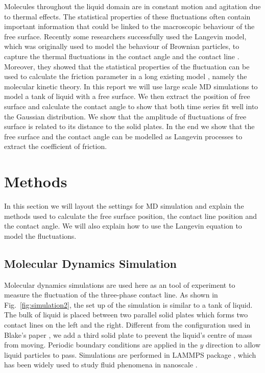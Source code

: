 \documentclass[
reprint,
 amsmath,amssymb,
 aps,
url
]{revtex4-1}
\begin{document}
Molecules throughout the liquid domain are in constant motion and agitation due to thermal effects. The statistical properties of these fluctuations often contain important information that could be linked to the macroscopic behaviour of the free surface. Recently some researchers successfully used the Langevin model, which was originally used to model the behaviour of Brownian particles, to capture the thermal fluctuations in the contact angle \cite{smith_langevin_2016} and the contact line \cite{fernandez-toledano_contact-line_2019}. Moreover, they showed that the statistical properties of the fluctuation can be used to calculate the friction parameter in a long existing model \cite{cherry_kinetics_1969, blake_kinetics_1969}, namely the molecular kinetic theory. In this report we will use large scale MD simulations to model a tank of liquid with a free surface. We then extract the position of free surface  and calculate the contact angle to show that both time series fit well into the Gaussian distribution. We show that the amplitude of fluctuations of free surface is related to its distance to the solid plates. In the end we show that the free surface and the contact angle can be modelled as Langevin processes to extract the coefficient of friction.



\section{Methods}

In this section we will layout the settings for MD simulation and explain the methods used to calculate the free surface position, the contact line position and the contact angle. We will also explain how to use the Langevin equation to model the fluctuations.

\subsection{Molecular Dynamics Simulation}

Molecular dynamics simulations are used here as an tool of experiment to measure the fluctuation of the three-phase contact line. As shown in Fig.~\ref{fig:simulation2}, the set up of the simulation is similar to a tank of liquid. The bulk of liquid is placed between two parallel solid plates which forms two contact lines on the left and the right. Different from the configuration used in Blake's paper \cite{fernandez-toledano_contact-line_2019}, we add a third solid plate to prevent the liquid's centre of mass from moving. Periodic boundary conditions are applied in the $y$ direction to allow liquid particles to pass.  Simulations are performed in LAMMPS package \cite{plimpton_fast_1995}, which has been widely used to study fluid phenomena in nanoscale \cite{blake_forced_2015,zhang_molecular_2019,zhao_revisiting_2019}.
\end{document}
